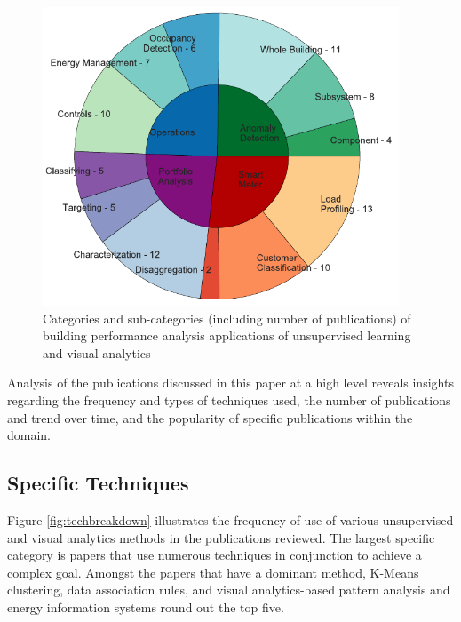 \documentclass[preprint,12pt,3p]{elsarticle}
\begin{document}
\begin{figure}[H]
\centering
\includegraphics[height=3.5in]{./Data/PieChart_resized}
\caption{Categories and sub-categories (including number of publications) of building performance analysis applications of unsupervised learning and visual analytics}
\label{fig:categoriespie}
\end{figure}

Analysis of the publications discussed in this paper at a high level reveals insights regarding the frequency and types of techniques used, the number of publications and trend over time, and the popularity of specific publications within the domain.

\subsection{Specific Techniques}
Figure \ref{fig:techbreakdown} illustrates the frequency of use of various unsupervised and visual analytics methods in the publications reviewed. The largest specific category is papers that use numerous techniques in conjunction to achieve a complex goal. Amongst the papers that have a dominant method, K-Means clustering, data association rules, and visual analytics-based pattern analysis and energy information systems round out the top five. 
\end{document}
